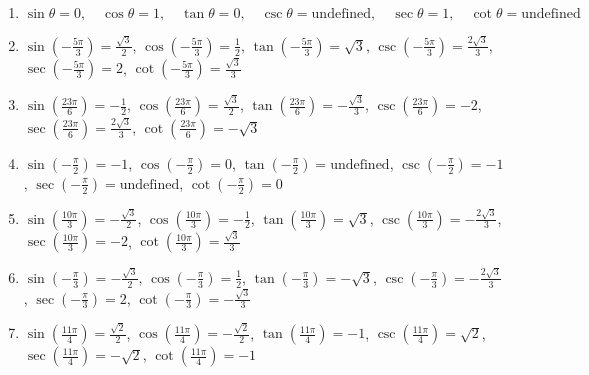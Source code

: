 \begin{enumerate}
    \item $\sin\theta = 0, \quad \cos\theta = 1, \quad \tan\theta = 0, \quad \csc\theta = \text{undefined}, \quad \sec\theta = 1, \quad \cot\theta = \text{undefined}$
    
    \item $\sin\left(-\frac{5\pi}{3}\right) = \frac{\sqrt{3}}{2}$, 
        $\cos\left(-\frac{5\pi}{3}\right) = \frac{1}{2}$, 
        $\tan\left(-\frac{5\pi}{3}\right) = \sqrt{3}$, 
        $\csc\left(-\frac{5\pi}{3}\right) = \frac{2\sqrt{3}}{3}$, 
        $\sec\left(-\frac{5\pi}{3}\right) = 2$, 
        $\cot\left(-\frac{5\pi}{3}\right) = \frac{\sqrt{3}}{3}$
        
    \item $\sin\left(\frac{23\pi}{6}\right) = -\frac{1}{2}$, 
        $\cos\left(\frac{23\pi}{6}\right) = \frac{\sqrt{3}}{2}$, 
        $\tan\left(\frac{23\pi}{6}\right) = -\frac{\sqrt{3}}{3}$, 
        $\csc\left(\frac{23\pi}{6}\right) = -2$, 
        $\sec\left(\frac{23\pi}{6}\right) = \frac{2\sqrt{3}}{3}$, 
        $\cot\left(\frac{23\pi}{6}\right) = -\sqrt{3}$
        
    \item $\sin\left(-\frac{\pi}{2}\right) = -1$, 
        $\cos\left(-\frac{\pi}{2}\right) = 0$, 
        $\tan\left(-\frac{\pi}{2}\right) = \text{undefined}$, 
        $\csc\left(-\frac{\pi}{2}\right) = -1$, 
        $\sec\left(-\frac{\pi}{2}\right) = \text{undefined}$, 
        $\cot\left(-\frac{\pi}{2}\right) = 0$
        
    \item $\sin\left(\frac{10\pi}{3}\right) = -\frac{\sqrt{3}}{2}$, 
        $\cos\left(\frac{10\pi}{3}\right) = -\frac{1}{2}$, 
        $\tan\left(\frac{10\pi}{3}\right) = \sqrt{3}$, 
        $\csc\left(\frac{10\pi}{3}\right) = -\frac{2\sqrt{3}}{3}$, 
        $\sec\left(\frac{10\pi}{3}\right) = -2$, 
        $\cot\left(\frac{10\pi}{3}\right) = \frac{\sqrt{3}}{3}$
        
    \item $\sin\left(-\frac{\pi}{3}\right) = -\frac{\sqrt{3}}{2}$, 
        $\cos\left(-\frac{\pi}{3}\right) = \frac{1}{2}$, 
        $\tan\left(-\frac{\pi}{3}\right) = -\sqrt{3}$, 
        $\csc\left(-\frac{\pi}{3}\right) = -\frac{2\sqrt{3}}{3}$, 
        $\sec\left(-\frac{\pi}{3}\right) = 2$, 
        $\cot\left(-\frac{\pi}{3}\right) = -\frac{\sqrt{3}}{3}$
        
    \item $\sin\left(\frac{11\pi}{4}\right) = \frac{\sqrt{2}}{2}$, 
        $\cos\left(\frac{11\pi}{4}\right) = -\frac{\sqrt{2}}{2}$, 
        $\tan\left(\frac{11\pi}{4}\right) = -1$, 
        $\csc\left(\frac{11\pi}{4}\right) = \sqrt{2}$, 
        $\sec\left(\frac{11\pi}{4}\right) = -\sqrt{2}$, 
        $\cot\left(\frac{11\pi}{4}\right) = -1$
        

\end{enumerate}
